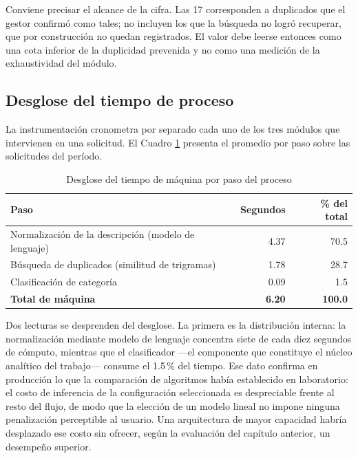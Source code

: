 Conviene precisar el alcance de la cifra. Las 17 corresponden a duplicados que el gestor confirmó como tales; no incluyen los que la búsqueda no logró recuperar, que por construcción no quedan registrados. El valor debe leerse entonces como una cota inferior de la duplicidad prevenida y no como una medición de la exhaustividad del módulo.

\subsection{Desglose del tiempo de proceso}

La instrumentación cronometra por separado cada uno de los tres módulos que intervienen en una solicitud. El Cuadro \ref{tab:desglose_maquina} presenta el promedio por paso sobre las solicitudes del período.

\begin{table}[htbp]
\centering
\caption{Desglose del tiempo de máquina por paso del proceso}
\label{tab:desglose_maquina}
\begin{tabular}{lrr}
\toprule
\textbf{Paso} & \textbf{Segundos} & \textbf{\% del total} \\
\midrule
Normalización de la descripción (modelo de lenguaje) & 4.37 & 70.5 \\
Búsqueda de duplicados (similitud de trigramas)      & 1.78 & 28.7 \\
Clasificación de categoría                            & 0.09 & 1.5 \\
\midrule
\textbf{Total de máquina} & \textbf{6.20} & \textbf{100.0} \\
\bottomrule
\end{tabular}
\end{table}

Dos lecturas se desprenden del desglose. La primera es la distribución interna: la normalización mediante modelo de lenguaje concentra siete de cada diez segundos de cómputo, mientras que el clasificador —el componente que constituye el núcleo analítico del trabajo— consume el 1.5\,\% del tiempo. Ese dato confirma en producción lo que la comparación de algoritmos había establecido en laboratorio: el costo de inferencia de la configuración seleccionada es despreciable frente al resto del flujo, de modo que la elección de un modelo lineal no impone ninguna penalización perceptible al usuario. Una arquitectura de mayor capacidad habría desplazado ese costo sin ofrecer, según la evaluación del capítulo anterior, un desempeño superior.

